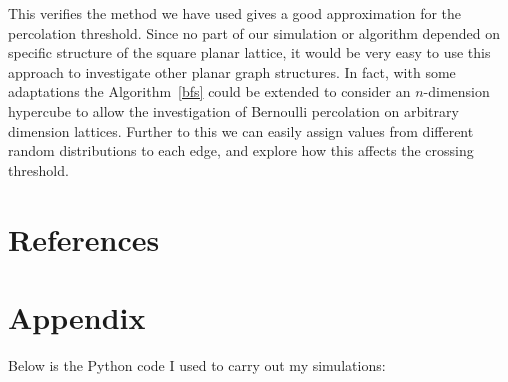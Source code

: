 \documentclass[a4paper,11pt]{article}
\theoremstyle{definition}
\begin{document}
This verifies the method we have used gives a good approximation for the percolation threshold. Since no part of our simulation or algorithm depended on specific structure of the square planar lattice, it would be very easy to use this approach to investigate other planar graph structures. In fact, with some adaptations the Algorithm~\ref*{bfs} could be extended to consider an $n$-dimension hypercube to allow the investigation of Bernoulli percolation on arbitrary dimension lattices. Further to this we can easily assign values from different random distributions to each edge, and explore how this affects the crossing threshold.






\section{References}
\printbibliography[heading=none]

\section{Appendix}
Below is the Python code I used to carry out my simulations:
\end{document}
